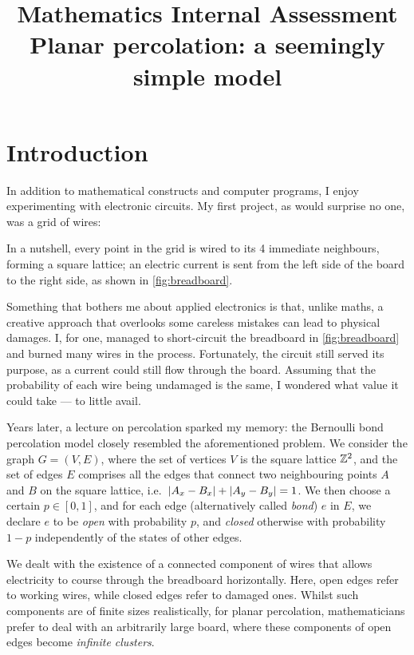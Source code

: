\documentclass[a4paper, 12pt]{article}
\title{
\textbf{Mathematics Internal Assessment}\\
\bigskip
Planar percolation: a seemingly simple model
}
\author{}
\date{}
\begin{document}
\maketitle

\section{Introduction}\label{ch:intro}
In addition to mathematical constructs and computer programs, I enjoy experimenting with electronic circuits. My first project, as would surprise no one, was a grid of wires:



In a nutshell, every point in the grid is wired to its 4 immediate neighbours, forming a square lattice; an electric current is sent from the left side of the board to the right side, as shown in \cref{fig:breadboard}.

Something that bothers me about applied electronics is that, unlike maths, a creative approach that overlooks some careless mistakes can lead to physical damages. I, for one, managed to short-circuit the breadboard in \cref{fig:breadboard} and burned many wires in the process. Fortunately, the circuit still served its purpose, as a current could still flow through the board. Assuming that the probability of each wire being undamaged is the same, I wondered what value it could take --- to little avail.


Years later, a lecture on percolation sparked my memory: the Bernoulli bond percolation model closely resembled the aforementioned problem. We consider the graph $G = (V, E)$, where the set of vertices $V$ is the square lattice $\mathbb{Z}^2$, and the set of edges $E$ comprises all the edges that connect two neighbouring points $A$ and $B$ on the square lattice, i.e.\ $\lvert A_x - B_x \rvert + \lvert A_y - B_y \rvert = 1$. We then choose a certain $p \in \left[0, 1\right]$, and for each edge (alternatively called \textit{bond}) $e$ in $E$, we declare $e$ to be \textit{open} with probability $p$, and \textit{closed} otherwise with probability $1 - p$ independently of the states of other edges. 

We dealt with the existence of a connected component of wires that allows electricity to course through the breadboard horizontally. Here, open edges refer to working wires, while closed edges refer to damaged ones. Whilst such components are of finite sizes realistically, for planar percolation, mathematicians prefer to deal with an arbitrarily large board, where these components of open edges become \textit{infinite clusters}.
\end{document}
